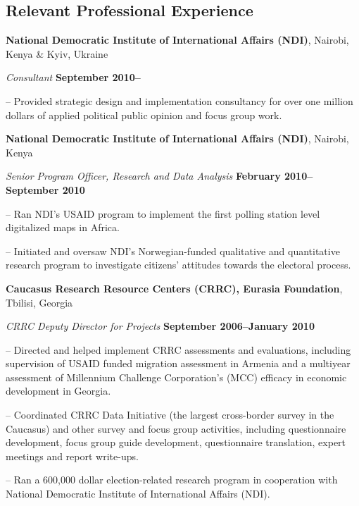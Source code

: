 \documentclass[margin,line]{res}
\newenvironment{list1}{
  \begin{list}{\ding{113}}{%
      \setlength{\itemsep}{0in}
      \setlength{\parsep}{0in} \setlength{\parskip}{0in}
      \setlength{\topsep}{0in} \setlength{\partopsep}{0in} 
      \setlength{\leftmargin}{0.17in}}}{\end{list}}
\begin{document}
{\begin{resume}
\section{\sc Relevant Professional Experience}
{\bf National Democratic Institute of International Affairs (NDI)},
Nairobi, Kenya \& Kyiv, Ukraine

\vspace{-.3cm}
{\em Consultant} \hfill {\bf
  September 2010--}\\
\begin{list1}
\item[]-- Provided strategic design and implementation consultancy
  for over one million dollars of applied
political public opinion and focus group work.
\end{list1}

{\bf National Democratic Institute of International Affairs (NDI)}, Nairobi, Kenya
\vspace{-.3cm}

{\em Senior Program Officer, Research and Data Analysis} \hfill {\bf
  February 2010--September 2010}\\
\vspace{-.3cm}
\begin{list1} 
\item[]-- Ran NDI's  USAID program to implement the first polling station level
digitalized maps in Africa.
\item[]-- Initiated and oversaw NDI's
Norwegian-funded qualitative and quantitative research program to
investigate citizens' attitudes towards the electoral process.
\end{list1}
{\bf Caucasus Research Resource Centers (CRRC), Eurasia Foundation},
Tbilisi, Georgia

\vspace{-.3cm}
{\em CRRC Deputy Director for Projects} \hfill {\bf
  September 2006--January 2010}\\

\vspace{-.3cm}
\begin{list1} 
\item[]-- Directed and helped implement CRRC assessments and evaluations,
  including supervision of USAID funded migration assessment in
  Armenia and a multiyear assessment of Millennium Challenge
  Corporation's (MCC) efficacy in economic development in
  Georgia. 
\item[]-- Coordinated CRRC Data Initiative (the largest cross-border
  survey in the Caucasus) and other survey and focus group activities,
  including questionnaire development, focus group guide development,
  questionnaire translation, expert meetings and report write-ups. 
\item[]-- Ran a 600,000 dollar election-related research program in
  cooperation with National Democratic Institute of International
  Affairs (NDI).
\end{list1}


\end{resume}}
\end{document}
